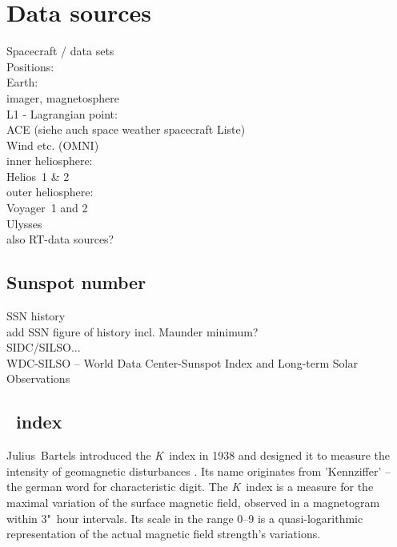 \section{Data sources}

Spacecraft / data sets\\

Positions:\\
Earth:\\
	imager, magnetosphere\\
L1 - Lagrangian point:\\
	ACE (siehe auch space weather spacecraft Liste)\\
	Wind etc. (OMNI)\\
inner heliosphere:\\
	Helios~1 \& 2\\
outer heliosphere:\\
	Voyager~1 and 2\\
	Ulysses\\

also RT-data sources?\\


\subsection{Sunspot number}

SSN history\\
add SSN figure of history incl. Maunder minimum?\\

SIDC/SILSO...\\
WDC-SILSO -- World Data Center-Sunspot Index and Long-term Solar Observations\\


\subsection{\Kp{}~index}
\label{sec:kp_index}
Julius~Bartels introduced the \textit{K}~index in 1938 and designed it to measure the intensity of geomagnetic disturbances \citep{Bartels1939}. Its name originates from 'Kennziffer' -- the german word for characteristic digit. The \textit{K}~index is a measure for the maximal variation of the surface magnetic field, observed in a magnetogram within 3"~hour intervals. Its scale in the range 0--9 is a quasi-logarithmic representation of the actual magnetic field strength's variations.

